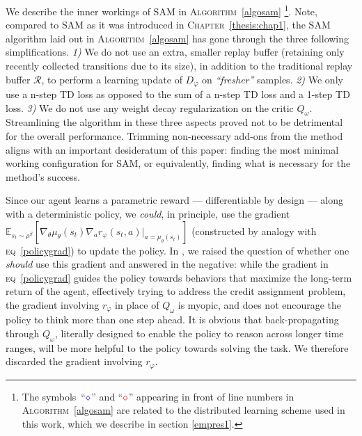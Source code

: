 We describe the inner workings of SAM in \textsc{Algorithm}~\ref{algosam}
\footnote{The symbols~``$\textcolor{blue}{\diamond}$''
and ``$\textcolor{red}{\diamond}$'' appearing
in front of line numbers in \textsc{Algorithm}~\ref{algosam}
are related to the distributed learning scheme
used in this work, which we describe in section \ref{empres1}.}.
Note, compared to SAM as it was introduced in \textsc{Chapter}~\ref{thesis:chap1},
the SAM algorithm laid out in \textsc{Algorithm}~\ref{algosam} has gone through the
three following simplifications.
\textit{1)} We do not use an extra, smaller replay buffer (retaining only recently collected transitions
due to its size), in addition to the traditional replay buffer $\mathcal{R}$,
to perform a learning update of $D_\varphi$ on \textit{``fresher''} samples.
\textit{2)} We only use a n-step TD loss as opposed to the sum of a n-step TD loss
and a 1-step TD loss.
\textit{3)} We do not use any weight decay regularization on the critic $Q_\omega$.
Streamlining the algorithm in these three aspects proved not to be detrimental for the overall performance.
Trimming non-necessary add-ons from the method aligns with an important desideratum of this paper:
finding the most minimal working configuration for SAM, or equivalently,
finding what is necessary for the method’s success.

Since our agent learns a parametric reward --- differentiable by design ---
along with a deterministic policy, we \emph{could}, in principle,
use the gradient
$\mathbb{E}_{s_t \sim \rho^\beta}[\nabla_\theta \mu_\theta(s_t)
\nabla_a r_\varphi (s_t, a) \rvert_{a = \mu_\theta(s_t)}]$
(constructed by analogy with \textsc{eq}~\ref{policygrad})
to update the policy.
In \cite{Blonde2019-vc}, we raised the question of whether one \emph{should} use this gradient
and answered in the negative:
while the gradient in \textsc{eq}~\ref{policygrad}
guides the policy towards behaviors that maximize the long-term return of the agent,
effectively trying to address the credit assignment problem,
the gradient involving $r_\varphi$ in place of $Q_\omega$ is myopic,
and does not encourage the policy to think more than one step ahead.
It is obvious that back-propagating through $Q_\omega$,
literally designed to enable the policy to reason across longer time ranges,
will be more helpful to the policy towards solving the task.
We therefore discarded the gradient involving $r_\varphi$.

